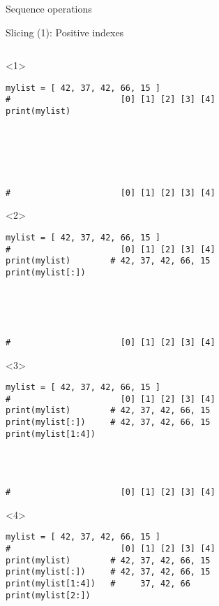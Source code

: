 \begin{frame}[fragile]{Sequence operations}

  \begin{center}

  Slicing (1): Positive indexes

  \smallskip

  \begin{columns}[onlytextwidth]
    \begin{column}{\textwidth}

      \begin{onlyenv}<1>
        \begin{lstlisting}[style=python,morekeywords={for, in, range, list}]
mylist = [ 42, 37, 42, 66, 15 ]
#                      [0] [1] [2] [3] [4]
print(mylist)






#                      [0] [1] [2] [3] [4] \end{lstlisting}
      \end{onlyenv}

      \begin{onlyenv}<2>
        \begin{lstlisting}[style=python,morekeywords={for, in, range, list}]
mylist = [ 42, 37, 42, 66, 15 ]
#                      [0] [1] [2] [3] [4]
print(mylist)        # 42, 37, 42, 66, 15
print(mylist[:])





#                      [0] [1] [2] [3] [4] \end{lstlisting}
      \end{onlyenv}

      \begin{onlyenv}<3>
        \begin{lstlisting}[style=python,morekeywords={for, in, range, list}]
mylist = [ 42, 37, 42, 66, 15 ]
#                      [0] [1] [2] [3] [4]
print(mylist)        # 42, 37, 42, 66, 15
print(mylist[:])     # 42, 37, 42, 66, 15
print(mylist[1:4])




#                      [0] [1] [2] [3] [4] \end{lstlisting}
      \end{onlyenv}

      \begin{onlyenv}<4>
        \begin{lstlisting}[style=python,morekeywords={for, in, range, list}]
mylist = [ 42, 37, 42, 66, 15 ]
#                      [0] [1] [2] [3] [4]
print(mylist)        # 42, 37, 42, 66, 15
print(mylist[:])     # 42, 37, 42, 66, 15
print(mylist[1:4])   #     37, 42, 66
print(mylist[2:])




\end{lstlisting}
\end{onlyenv}
\end{column}
\end{columns}
\end{center}
\end{frame}
